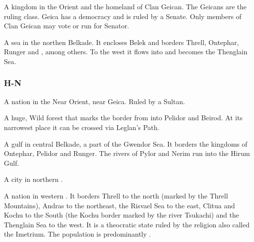 A kingdom in the Orient and the homeland of Clan Geican. The Geicans are the ruling class. Geica has a democracy and is ruled by a Senate. Only members of Clan Geican may vote or run for Senator. 



A sea in the northen Belkade. It encloses Belek and borders Threll, Ontephar, Runger and \Redce{}, among others. To the west it flows into and becomes the Thenglain Sea. 



\subsubsection{H-N}

A nation in the Near Orient, near Geica. Ruled by a Sultan. 



A huge, Wild forest that marks the border from \Scyrum{} into Pelidor and Beirod. 
At its narrowest place it can be crossed via Leglan's Path. 



A gulf in central Belkade, a part of the Gwendor Sea. It borders the kingdoms of Ontephar, Pelidor and Runger. The rivers of Pylor and Nerim run into the Hirum Gulf. 



A city in northern \Scyrum{}. 



A nation in western \Azmith{}. It borders Threll to the north (marked by the Threll Mountains), Andras to the northeast, the Risvael Sea to the east, Clitua and Kochu to the South (the Kochu border marked by the river Tsukachi) and the Thenglain Sea to the west. It is a theocratic state ruled by the religion also called the Imetrium. The population is predominantly \scathaese{}. 


